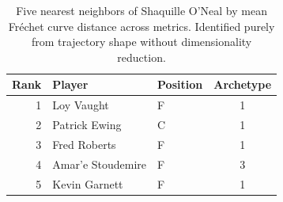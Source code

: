\begin{table}[htbp]
  \centering\small
  \begin{tabular}{rllc}
    \toprule
    Rank & Player & Position & Archetype \\
    \midrule
    1 & Loy Vaught & F & 1 \\
    2 & Patrick Ewing & C & 1 \\
    3 & Fred Roberts & F & 1 \\
    4 & Amar'e Stoudemire & F & 3 \\
    5 & Kevin Garnett & F & 1 \\
    \bottomrule
  \end{tabular}
  \caption{Five nearest neighbors of Shaquille O'Neal by mean Fr\'{e}chet curve distance across metrics. Identified purely from trajectory shape without dimensionality reduction.}
  \label{tab:Shaquille_O_Neal_frechet_curve_neighbors}
\end{table}

